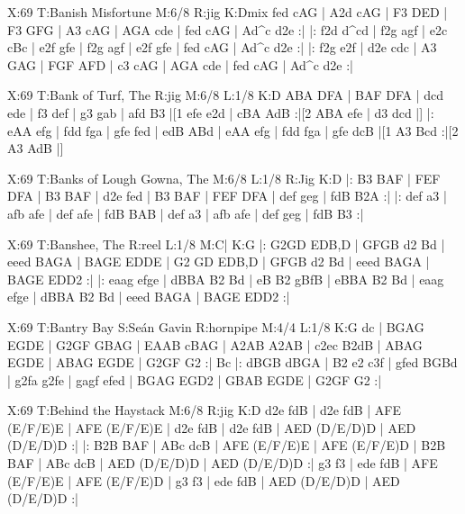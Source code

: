 \documentclass{article}
\begin{document}
\begin{abc}[name]
X:69
T:Banish Misfortune
M:6/8
R:jig
K:Dmix
fed cAG | A2d cAG | F3 DED | F3 GFG |
A3 cAG | AGA cde | fed cAG | Ad^c d2e :|
|: f2d d^cd | f2g agf | e2c cBc | e2f gfe |
f2g agf | e2f gfe | fed cAG | Ad^c d2e :|
|: f2g e2f | d2e cdc | A3 GAG | FGF AFD |
c3 cAG | AGA cde | fed cAG | Ad^c d2e :|
\end{abc}

\begin{abc}[name]
X:69
T:Bank of Turf, The
R:jig
M:6/8
L:1/8
K:D
ABA DFA | BAF DFA | dcd ede | f3 def |
g3 gab | afd B3 |[1 efe e2d | cBA AdB :|[2 ABA efe | d3 dcd |]
|: eAA efg | fdd fga | gfe fed | edB ABd |
eAA efg | fdd fga | gfe dcB |[1 A3 Bcd :|[2 A3 AdB |]
\end{abc}

\begin{abc}[name]
X:69
T:Banks of Lough Gowna, The
M:6/8
L:1/8
R:Jig
K:D
|: B3 BAF | FEF DFA | B3 BAF | d2e fed |
B3 BAF | FEF DFA | def geg | fdB B2A :|
|: def a3 | afb afe | def afe | fdB BAB |
def a3 | afb afe | def geg | fdB B3 :|
\end{abc}

\begin{abc}[name]
X:69
T:Banshee, The
R:reel
L:1/8
M:C|
K:G
|: G2GD EDB,D | GFGB d2 Bd | eeed BAGA | BAGE EDDE |
 G2 GD EDB,D | GFGB d2 Bd | eeed BAGA | BAGE EDD2 :|
|: eaag efge | dBBA B2 Bd | eB B2 gBfB | eBBA B2 Bd |
 eaag efge | dBBA B2 Bd | eeed BAGA | BAGE EDD2 :|
\end{abc}

\begin{abc}[name]
X:69
T:Bantry Bay
S:Seán Gavin
R:hornpipe
M:4/4
L:1/8
K:G
dc | BGAG EGDE | G2GF GBAG | EAAB cBAG | A2AB A2AB |
c2ec B2dB | ABAG EGDE | ABAG EGDE | G2GF G2 :|
Bc |: dBGB dBGA | B2 e2 c3f | gfed BGBd | g2fa g2fe |
gagf efed | BGAG EGD2 | GBAB EGDE | G2GF G2 :|
\end{abc}

\begin{abc}[name]
X:69
T:Behind the Haystack
M:6/8
R:jig
K:D
d2e fdB | d2e fdB | AFE (E/F/E)E | AFE (E/F/E)E |
d2e fdB | d2e fdB | AED (D/E/D)D | AED (D/E/D)D :|
|: B2B BAF | ABc dcB | AFE (E/F/E)E | AFE (E/F/E)D |
B2B BAF | ABc dcB | AED (D/E/D)D | AED (D/E/D)D :|
g3 f3 | ede fdB | AFE (E/F/E)E | AFE (E/F/E)D |
g3 f3 | ede fdB | AED (D/E/D)D | AED (D/E/D)D :|
\end{abc}
\end{document}

